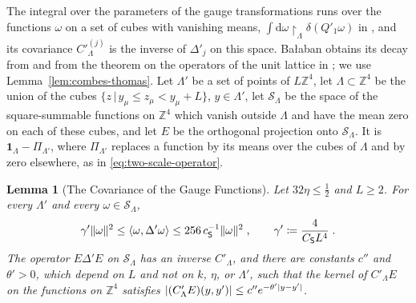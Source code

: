 \documentclass[11pt]{preprint}
\newcommand{\dd}{\mathrm{d}}
\DeclarePairedDelimiter{\abs}{\lvert}{\rvert}
\DeclarePairedDelimiter{\norm}{\lVert}{\rVert}
\numberwithin{equation}{section}
\newtheorem{lemma}[theorem]{Lemma}
\theoremstyle{definition}
\theoremstyle{remark}
\theoremstyle{plain}
\begin{document}
The integral over the parameters of the gauge transformations runs over the functions $\omega$ on a set of cubes with vanishing means, $\int\dd\omega\restriction_\Lambda\delta(Q'_1\omega)$ in \cite[(2.106)]{BalabanPRT2}, and its covariance $C'^{(j)}_\Lambda$ is the inverse of $\Delta'_j$ on this space. Ba{\l}aban obtains its decay from \cite[(2.110)]{BalabanPRT2} and from the theorem on the operators of the unit lattice in \cite{BalabanRDG}; we use Lemma~\ref{lem:combes-thomas}. Let $\Lambda'$ be a set of points of $L\mathbb Z^4$, let $\Lambda \subset \mathbb Z^4$ be the union of the cubes $\{ z \, | \, y_\mu \leq z_\mu < y_\mu + L \}$, $y \in \Lambda'$, let $\mathcal S_\Lambda$ be the space of the square-summable functions on $\mathbb Z^4$ which vanish outside $\Lambda$ and have the mean zero on each of these cubes, and let $E$ be the orthogonal projection onto $\mathcal S_\Lambda$. It is $\mathbf 1_\Lambda - \Pi_{\Lambda'}$, where $\Pi_{\Lambda'}$ replaces a function by its means over the cubes of $\Lambda$ and by zero elsewhere, as in \eqref{eq:two-scale-operator}.

\begin{lemma}[The Covariance of the Gauge Functions]\label{lem:gauge-covariance}
Let $32\eta \leq \frac12$ and $L \geq 2$. For every $\Lambda'$ and every $\omega \in \mathcal S_\Lambda$,
\begin{equation}\label{eq:gauge-form-bounds}
    \gamma'\norm\omega^2 \leq \langle\omega, \Delta'\omega\rangle \leq 256\,c_{\mathsf S}^{-1}\norm\omega^2\;,
    \qquad
    \gamma' \coloneqq \frac{4}{C_{\mathsf S}L^4}\;.
\end{equation}
The operator $E\Delta'E$ on $\mathcal S_\Lambda$ has an inverse $C'_\Lambda$, and there are constants $c''$ and $\theta' > 0$, which depend on $L$ and not on $k$, $\eta$, or $\Lambda'$, such that the kernel of $C'_\Lambda E$ on the functions on $\mathbb Z^4$ satisfies $\abs{(C'_\Lambda E)(y, y')} \leq c''e^{-\theta'\abs{y - y'}}$.
\end{lemma}
\end{document}
